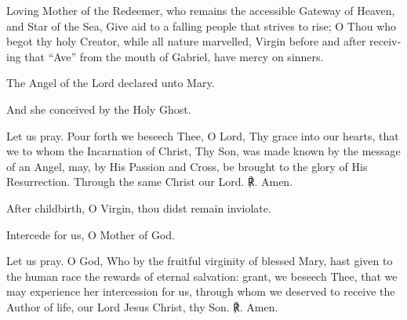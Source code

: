 \begin{otherlanguage}{english}\noindent Loving Mother of the Redeemer, 
who remains the accessible Gateway of Heaven,
and Star of the Sea,
Give aid to a falling people 
that strives to rise;
O Thou who begot thy holy Creator,
while all nature marvelled,
Virgin before and after
receiving that ``Ave'' from the mouth of Gabriel,
have mercy on sinners.


\noindent \vv The Angel of the Lord declared unto Mary.

\noindent \rr And she conceived by the Holy Ghost.

\noindent Let us pray. Pour forth we beseech Thee, O Lord, Thy grace into our hearts, that we to whom the Incarnation of Christ, Thy Son, was made known by the message of an Angel, may, by His Passion and Cross, be brought to the glory of His Resurrection. Through the same Christ our Lord. ℟. Amen.


\noindent \vv After childbirth, O Virgin, thou didst remain inviolate.

\noindent \rr Intercede for us, O Mother of God.

\noindent Let us pray. O God, Who by the fruitful virginity of blessed Mary, hast given to the human race the rewards of eternal salvation: grant, we beseech Thee, that we may experience her intercession for us, through whom we deserved to receive the Author of life, our Lord Jesus Christ, thy Son. ℟. Amen.
\end{otherlanguage}